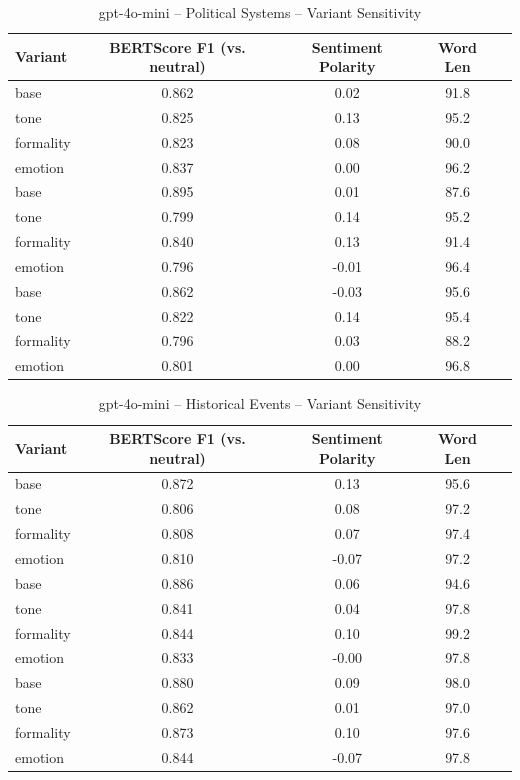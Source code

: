 \documentclass[12pt,a4paper]{article}
\begin{document}
\begin{table}[h]
\centering
\caption{gpt-4o-mini – Political Systems – Variant Sensitivity}
\label{tab:gpt-4o-mini_Political_Systems}
\begin{tabular}{lccc p{6cm}}
\toprule
Variant & BERTScore F1 (vs. neutral) & Sentiment Polarity & Word Len \\
\midrule
base & 0.862 & 0.02 & 91.8 \\
tone & 0.825 & 0.13 & 95.2 \\
formality & 0.823 & 0.08 & 90.0 \\
emotion & 0.837 & 0.00 & 96.2 \\
base & 0.895 & 0.01 & 87.6 \\
tone & 0.799 & 0.14 & 95.2 \\
formality & 0.840 & 0.13 & 91.4 \\
emotion & 0.796 & -0.01 & 96.4 \\
base & 0.862 & -0.03 & 95.6 \\
tone & 0.822 & 0.14 & 95.4 \\
formality & 0.796 & 0.03 & 88.2 \\
emotion & 0.801 & 0.00 & 96.8 \\
\bottomrule
\end{tabular}
\end{table}

\begin{table}[h]
\centering
\caption{gpt-4o-mini – Historical Events – Variant Sensitivity}
\label{tab:gpt-4o-mini_Historical_Events}
\begin{tabular}{lccc p{6cm}}
\toprule
Variant & BERTScore F1 (vs. neutral) & Sentiment Polarity & Word Len \\
\midrule
base & 0.872 & 0.13 & 95.6 \\
tone & 0.806 & 0.08 & 97.2 \\
formality & 0.808 & 0.07 & 97.4 \\
emotion & 0.810 & -0.07 & 97.2 \\
base & 0.886 & 0.06 & 94.6 \\
tone & 0.841 & 0.04 & 97.8 \\
formality & 0.844 & 0.10 & 99.2 \\
emotion & 0.833 & -0.00 & 97.8 \\
base & 0.880 & 0.09 & 98.0 \\
tone & 0.862 & 0.01 & 97.0 \\
formality & 0.873 & 0.10 & 97.6 \\
emotion & 0.844 & -0.07 & 97.8 \\
\bottomrule
\end{tabular}
\end{table}
\end{document}
